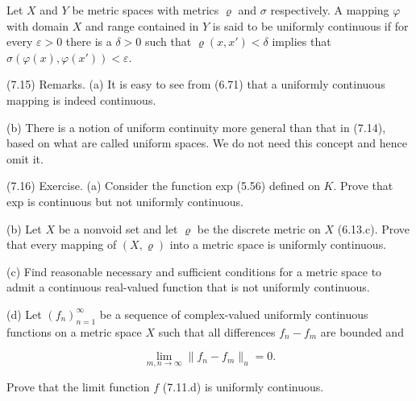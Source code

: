 Let $X$ and $Y$ be metric spaces with metrics $\varrho$ and $\sigma$ respectively. A mapping $\varphi$ with domain $X$ and range contained in $Y$ is said to be uniformly continuous if for every $\varepsilon > 0$ there is a $\delta > 0$ such that $\varrho(x, x') < \delta$ implies that $\sigma(\varphi(x), \varphi(x')) < \varepsilon$.

(7.15) Remarks. (a) It is easy to see from (6.71) that a uniformly continuous mapping is indeed continuous.

(b) There is a notion of uniform continuity more general than that in (7.14), based on what are called uniform spaces. We do not need this concept and hence omit it.

(7.16) Exercise. (a) Consider the function exp (5.56) defined on $K$. Prove that exp is continuous but not uniformly continuous.

(b) Let $X$ be a nonvoid set and let $\varrho$ be the discrete metric on $X$ (6.13.c). Prove that every mapping of $(X, \varrho)$ into a metric space is uniformly continuous.

(c) Find reasonable necessary and sufficient conditions for a metric space to admit a continuous real-valued function that is not uniformly continuous.

(d) Let $(f_n)_{n=1}^{\infty}$ be a sequence of complex-valued uniformly continuous functions on a metric space $X$ such that all differences $f_n - f_m$ are bounded and

$$\lim_{m,n \to \infty} \|f_n - f_m\|_u = 0.$$

Prove that the limit function $f$ (7.11.d) is uniformly continuous.
